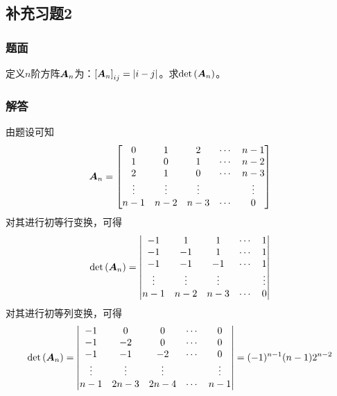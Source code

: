 \documentclass[10pt,xcolor=svgnames]{beamer} %
\begin{document}
\subsection*{补充习题2}
\begin{frame}
    \frametitle{题面}
    定义\(n\)阶方阵\(\boldsymbol{A}_n\)为：\(\left[ \boldsymbol{A}_n \right]_{ij}=\left|i-j \right|\)。求\(\mathrm{det}\left( \boldsymbol{A}_n \right)\)。
\end{frame}
\begin{frame}[allowframebreaks]
    \frametitle{解答}
    由题设可知
    \begin{equation*}
        \boldsymbol{A}_n=
        \begin{bmatrix}
            0      & 1      & 2      & \cdots & n-1    \\
            1      & 0      & 1      & \cdots & n-2    \\
            2      & 1      & 0      & \cdots & n-3    \\
            \vdots & \vdots & \vdots &        & \vdots \\
            n-1    & n-2    & n-3    & \cdots & 0
        \end{bmatrix}
    \end{equation*}
    对其进行初等行变换，可得
    \begin{equation*}
        \mathrm{det}\left( \boldsymbol{A}_n \right)=
        \begin{vmatrix}
            -1     & 1      & 1      & \cdots & 1      \\
            -1     & -1     & 1      & \cdots & 1      \\
            -1     & -1     & -1     & \cdots & 1      \\
            \vdots & \vdots & \vdots &        & \vdots \\
            n-1    & n-2    & n-3    & \cdots & 0
        \end{vmatrix}
    \end{equation*}
    对其进行初等列变换，可得
    \begin{equation*}
        \mathrm{det}\left( \boldsymbol{A}_n \right)=
        \begin{vmatrix}
            -1     & 0      & 0      & \cdots & 0      \\
            -1     & -2     & 0      & \cdots & 0      \\
            -1     & -1     & -2     & \cdots & 0      \\
            \vdots & \vdots & \vdots &        & \vdots \\
            n-1    & 2n-3   & 2n-4   & \cdots & n-1
        \end{vmatrix}=(-1)^{n-1}(n-1)2^{n-2}
    \end{equation*}
\end{frame}
\end{document}
